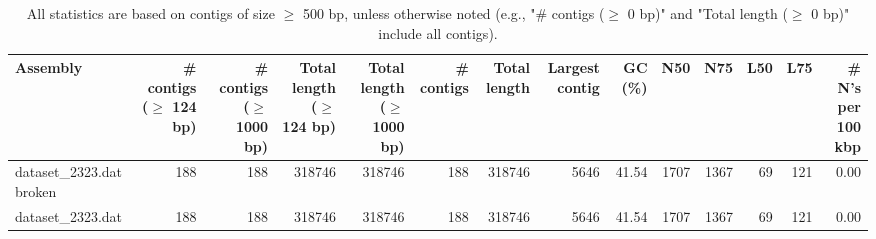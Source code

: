 \documentclass[12pt,a4paper]{article}
\begin{document}
\begin{table}[ht]
\begin{center}
\caption{All statistics are based on contigs of size $\geq$ 500 bp, unless otherwise noted (e.g., "\# contigs ($\geq$ 0 bp)" and "Total length ($\geq$ 0 bp)" include all contigs).}
\begin{tabular}{|l*{13}{|r}|}
\hline
Assembly & \# contigs ($\geq$ 124 bp) & \# contigs ($\geq$ 1000 bp) & Total length ($\geq$ 124 bp) & Total length ($\geq$ 1000 bp) & \# contigs & Total length & Largest contig & GC (\%) & N50 & N75 & L50 & L75 & \# N's per 100 kbp \\ \hline
dataset\_2323.dat broken & 188 & 188 & 318746 & 318746 & 188 & 318746 & 5646 & 41.54 & 1707 & 1367 & 69 & 121 & 0.00 \\ \hline
dataset\_2323.dat & 188 & 188 & 318746 & 318746 & 188 & 318746 & 5646 & 41.54 & 1707 & 1367 & 69 & 121 & 0.00 \\ \hline
\end{tabular}
\end{center}
\end{table}
\end{document}
